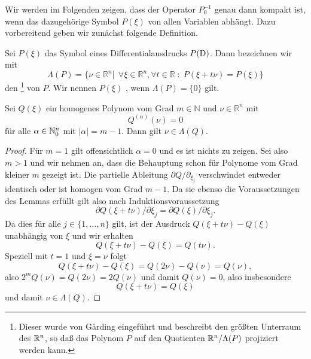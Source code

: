 Wir werden im Folgenden zeigen, dass der Operator $P_0^{-1}$ genau dann kompakt ist, wenn das dazugehörige Symbol $P(\xi)$ von allen Variablen abhängt. Dazu vorbereitend geben wir zunächst folgende Definition.
\begin{df}
Sei $P(\xi)$ das Symbol eines Differentialausdrucks $P(\mathrm D)$. Dann bezeichnen wir mit
\begin{equation}
\Lambda(P)=\{ \nu \in \mathbb{R}^n| \ \ \forall \xi \in \mathbb{R}^n, \forall t \in \mathbb{R} \;:\; P(\xi + t\nu) = P(\xi)  \}
\end{equation}
den \footnote{Dieser wurde von G\r{a}rding eingeführt und beschreibt den größten Unterraum des $\mathbb R^n$, so daß das Polynom $P$ auf den Quotienten $\mathbb R^n/\Lambda(P)$ projiziert werden kann.} von $P$. Wir nennen $P(\xi)$ , wenn $\Lambda(P)=\{0\}$ gilt.
\end{df}
\begin{lem}\label{Lema:homogene Polynome} 
Sei $Q(\xi)$ ein homogenes Polynom vom Grad $m \in \mathbb{N}$ und  $\nu \in \mathbb{R}^n$ mit
\begin{equation}
Q^{(\alpha)}(\nu)=0
\end{equation}
für alle $\alpha\in\mathbb N_0^n$ mit $|\alpha|=m-1$. Dann gilt $\nu \in \Lambda(Q)$.
\end{lem}
\begin{proof}
Für $m=1$ gilt offensichtlich $\alpha = 0$ und es ist nichts zu zeigen. Sei also $m>1$ und wir nehmen an, dass die Behauptung schon für Polynome vom Grad kleiner $m$ gezeigt ist. Die partielle Ableitung $\partial Q/\partial_{\xi_j}$ verschwindet entweder identisch oder ist homogen vom Grad $m-1$. Da sie ebenso die Voraussetzungen des Lemmas erfüllt gilt also nach Induktionsvoraussetzung
\begin{equation}
\partial Q(\xi + t \nu)/ \partial \xi_j = \partial Q(\xi)/\partial \xi_j.
\end{equation}
Da dies für alle $j\in\{1,\ldots,n\}$ gilt, ist der Ausdruck $Q(\xi + t \nu) - Q(\xi)$ unabhängig von $\xi$ und wir erhalten
\begin{equation}
Q(\xi + t \nu) - Q(\xi) = Q(t \nu).
\end{equation}
Speziell mit $t=1$ und $\xi=\nu$ folgt
\begin{equation}
Q(\xi + t\nu) - Q(\xi) = Q(2 \nu) - Q(\nu)= Q(\nu), 
\end{equation}
also $2^mQ(\nu)=Q(2\nu) = 2 Q(\nu)$ und damit $Q(\nu)=0$, also insbesondere
\begin{equation}
Q(\xi + t\nu) = Q(\xi)
\end{equation}
und damit $\nu \in \Lambda(Q)$.
\end{proof}
